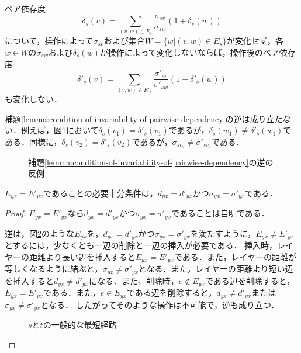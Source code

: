 \begin{lemma-without-proof}
  \label{lemma:condition-of-invariability-of-pairwise-dependency}
  ペア依存度
  \begin{equation}
    \label{eq:pairwise-dependency}
    \delta_s(v)=\sum_{(v,w)\in E_s}\frac{\sigma_{sv}}{\sigma_{sw}}(1+\delta_s(w))
  \end{equation}
  について，操作によって$\sigma_{sv}$および集合$W=\{w|(v,w)\in E_s\}$が変化せず，各$w\in W$の$\sigma_{sw}$および$\delta_s(w)$が操作によって変化しないならば，操作後のペア依存度
 \begin{equation}
    \label{eq:pairwise-dependency-after-update}
    \delta'_s(v)=\sum_{(v,w)\in E'_s}\frac{\sigma'_{sv}}{\sigma'_{sw}}(1+\delta'_s(w))
  \end{equation}
 も変化しない．
\end{lemma-without-proof}

補題\ref{lemma:condition-of-invariability-of-pairwise-dependency}の逆は成り立たない．例えば，図\ref{fig:pd-invariability-counterexample}において$\delta_s(v_1)=\delta'_s(v_1)$であるが，$\delta_s(w_1)\neq\delta'_s(w_1)$である．同様に，$\delta_s(v_2)=\delta'_s(v_2)$であるが，$\sigma_{sv_2}\neq\sigma'_{sv_2}$である．

\begin{figure}[tb]
  \centering
  \def\svgwidth{.45\linewidth}
  
  \caption{補題\ref{lemma:condition-of-invariability-of-pairwise-dependency}の逆の反例}
  \label{fig:pd-invariability-counterexample}
\end{figure}


\begin{lemma}
  \label{lemma:condition-of-invariability-of-shortest-path}
  $E_{yx}=E'_{yx}$であることの必要十分条件は，$d_{yx}=d'_{yx}$かつ$\sigma_{yx}=\sigma'_{yx}$である．
\end{lemma}
\begin{proof}
  $E_{yx}=E'_{yx}$なら$d_{yx}=d'_{yx}$かつ$\sigma_{yx}=\sigma'_{yx}$であることは自明である．

  逆は，図\ref{fig:proof-invariability-of-paths}のような$E_{yx}$を，$d_{yx}=d'_{yx}$かつ$\sigma_{yx}=\sigma'_{yx}$を満たすように，$E_{yx}\neq E'_{yx}$とするには，少なくとも一辺の削除と一辺の挿入が必要である．
  挿入時，レイヤーの距離より長い辺を挿入すると$E_{yx}=E'_{yx}$である．また，レイヤーの距離が等しくなるように結ぶと，$\sigma_{yx}\neq\sigma'_{yx}$となる．また，レイヤーの距離より短い辺を挿入すると$d_{yx}\neq d'_{yx}$になる．また，削除時，$e\notin E_{yx}$である辺を削除すると，$E_{yx}=E'_{yx}$である．また，$e\in E_{yx}$である辺を削除すると，$d_{yx}\neq d'_{yx}$または$\sigma_{yx}\neq\sigma'_{yx}$となる．
  したがってそのような操作は不可能で，逆も成り立つ．

  \begin{figure}
    \centering
    \def\svgwidth{.5\columnwidth}
    
    \caption{$s$と$t$の一般的な最短経路}
    \label{fig:proof-invariability-of-paths}
  \end{figure}
\end{proof}

